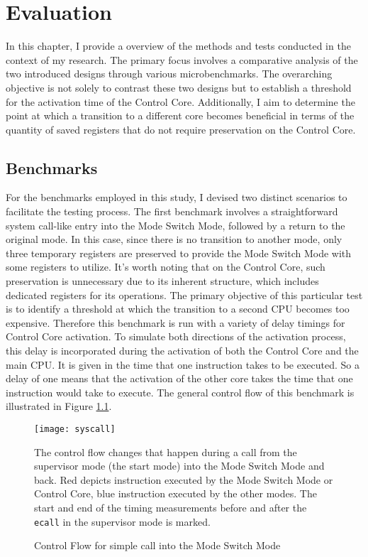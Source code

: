 \chapter{Evaluation}
In this chapter, I provide a overview of the methods and tests
conducted in the context of my research. The primary focus involves a
comparative analysis of the two introduced designs through various
microbenchmarks. The overarching objective is not solely to contrast these two
designs but to establish a threshold for the activation time of the Control
Core. Additionally, I aim to determine the point at which a transition to a
different core becomes beneficial in terms of the quantity of saved registers
that do not require preservation on the Control Core.

\section{Benchmarks}
For the benchmarks employed in this study, I devised two distinct
scenarios to facilitate the testing process. The first benchmark involves a
straightforward system call-like entry into the Mode Switch Mode, followed by a
return to the original mode. In this case, since there is no transition to
another mode, only three temporary registers are preserved to provide the Mode
Switch Mode with some registers to utilize. It's worth noting that on the
Control Core, such preservation is unnecessary due to its inherent structure,
which includes dedicated registers for its operations. The primary objective of
this particular test is to identify a threshold at which the transition to a
second CPU becomes too expensive. Therefore this benchmark is run with a variety
of delay timings for Control Core activation. To simulate both directions
of the activation process, this delay is incorporated during the activation of
both the Control Core and the main CPU. It is given in the time that one
instruction takes to be executed. So a delay of one means that the activation of
the other core takes the time that one instruction would take to execute. The
general control flow of this benchmark is illustrated in Figure
\ref{fig:syscall}.\par

\begin{figure}[h]
    \centering
    \texttt{[image: syscall]}
    \captionsetup{justification=centering}
    \caption{Control Flow for simple call into the Mode Switch Mode}
            The control flow changes that happen during a call from the
            supervisor mode (the start mode) into the Mode Switch Mode and back.
            Red depicts instruction executed by the Mode Switch Mode or Control
            Core, blue instruction executed by the other modes. The start and
            end of the timing measurements before and after the \texttt{ecall}
            in the supervisor mode is marked. 
    \label{fig:syscall}
\end{figure}

